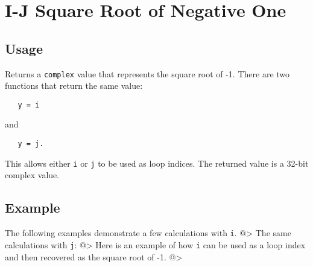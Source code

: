 \section{I-J Square Root of Negative One}

\subsection{Usage}

Returns a \verb|complex| value that represents the square root of -1.  There are two
functions that return the same value:
\begin{verbatim}
   y = i
\end{verbatim}
and 
\begin{verbatim}
   y = j.
\end{verbatim}
This allows either \verb|i| or \verb|j| to be used as loop indices.  The returned value is a 32-bit complex value.
\subsection{Example}

The following examples demonstrate a few calculations with \verb|i|.
@>
The same calculations with \verb|j|:
@>
Here is an example of how \verb|i| can be used as a loop index and then recovered as the square root of -1.
@>
